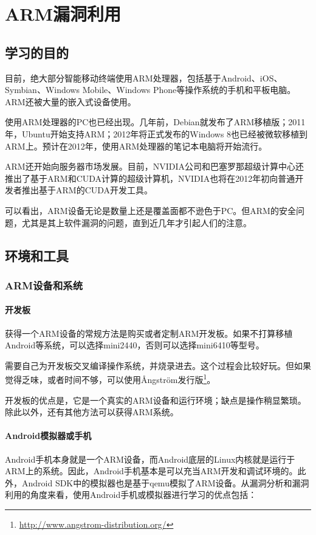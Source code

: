\chapter{ARM漏洞利用}
\section{学习的目的}
目前，绝大部分智能移动终端使用ARM处理器，包括基于Android、iOS、Symbian、Windows Mobile、Windows Phone等操作系统的手机和平板电脑。ARM还被大量的嵌入式设备使用。

使用ARM处理器的PC也已经出现。几年前，Debian就发布了ARM移植版；2011年，Ubuntu开始支持ARM；2012年将正式发布的Windows 8也已经被微软移植到ARM上。预计在2012年，使用ARM处理器的笔记本电脑将开始流行。

ARM还开始向服务器市场发展。目前，NVIDIA公司和巴塞罗那超级计算中心还推出了基于ARM和CUDA计算的超级计算机，NVIDIA也将在2012年初向普通开发者推出基于ARM的CUDA开发工具。

可以看出，ARM设备无论是数量上还是覆盖面都不逊色于PC。但ARM的安全问题，尤其是其上软件漏洞的问题，直到近几年才引起人们的注意。
\section{环境和工具}
\subsection{ARM设备和系统}
\subsubsection{开发板}
获得一个ARM设备的常规方法是购买或者定制ARM开发板。如果不打算移植Android等系统，可以选择mini2440，否则可以选择mini6410等型号。

需要自己为开发板交叉编译操作系统，并烧录进去。这个过程会比较好玩。但如果觉得乏味，或者时间不够，可以使用Ångström发行版\footnote{\url{http://www.angstrom-distribution.org/}}。

开发板的优点是，它是一个真实的ARM设备和运行环境；缺点是操作稍显繁琐。除此以外，还有其他方法可以获得ARM系统。

\subsubsection{Android模拟器或手机}
Android手机本身就是一个ARM设备，而Android底层的Linux内核就是运行于ARM上的系统。因此，Android手机基本是可以充当ARM开发和调试环境的。此外，Android SDK中的模拟器也是基于qemu模拟了ARM设备。从漏洞分析和漏洞利用的角度来看，使用Android手机或模拟器进行学习的优点包括：

